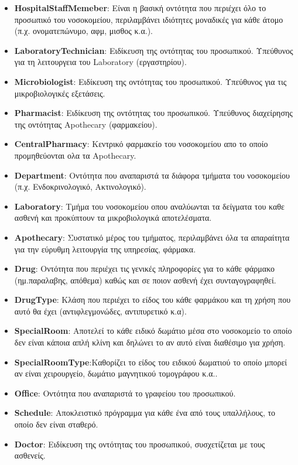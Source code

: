 \documentclass{article}
\begin{document}
\begin{itemize}
    \item \textbf{HospitalStaffMemeber}: Είναι η βασική οντότητα που περιέχει όλο το προσωπικό του νοσοκομείου, περιλαμβάνει ιδιότητες μοναδικές για κάθε άτομο (π.χ. ονοματεπώνυμο, αφμ, μισθος κ.α.).
    \item \textbf{LaboratoryTechnician}: Ειδίκευση της οντότητας του προσωπικού. Υπεύθυνος για τη λειτουργεια του Laboratory (εργαστηρίου).
    \item \textbf{Microbiologist}: Ειδίκευση της οντότητας του προσωπικού. Υπεύθυνος για τις μικροβιολογικές εξετάσεις.
    \item \textbf{Pharmacist}: Ειδίκευση της οντότητας του προσωπικού. Υπεύθυνος διαχείρησης της οντότητας Apothecary (φαρμακείου).
    \item \textbf{CentralPharmacy}: Κεντρικό φαρμακείο του νοσοκομείου απο το οποίο προμηθεύονται ολα τα Apothecary.
    \item \textbf{Department}: Οντότητα που αναπαριστά τα διάφορα τμήματα του νοσοκομείου (π.χ. Ενδοκρινολογικό, Ακτινολογικό).
    \item \textbf{Laboratory}: Τμήμα του νοσοκομείου οπου αναλύωνται τα δείγματα του καθε ασθενή και προκύπτουν τα μικροβιολογικά αποτελέσματα. 
    \item \textbf{Apothecary}: Συστατικό μέρος του τμήματος, περιλαμβάνει όλα τα απαραίτητα για την εύρυθμη λειτουργία της υπηρεσίας, φάρμακα.
    \item \textbf{Drug}: Οντότητα που περιέχει τις γενικές πληροφορίες για το κάθε φάρμακο (ημ.παραλαβης, απόθεμα) καθώς και σε ποιον ασθενή έχει συνταγογραφηθεί.
    \item \textbf{DrugType}: Κλάση που περιέχει το είδος του κάθε φαρμάκου και τη χρήση που αυτό θα έχει (αντιφλεγμονώδες, αντιπυρετικό κ.α).
    \item \textbf{SpecialRoom}: Αποτελεί το κάθε ειδικό δωμάτιο μέσα στο νοσοκομείο το οποίο δεν είναι κάποια απλή κλίνη και δηλώνει το αν αυτό είναι διαθέσιμο για χρήση.
    \item \textbf{SpecialRoomType}:Καθορίζει το είδος του ειδικού δωματιού το οποίο μπορεί αν είναι χειρουργείο, δωμάτιο μαγνητικού τομογράφου κ.α..
    \item \textbf{Office}: Οντότητα που αναπαριστά το γραφείου του προσωπικού.
    \item \textbf{Schedule}: Αποκλειστικό πρόγραμμα για κάθε ένα από τους υπαλλήλους, το οποίο δεν είναι σταθερό.
    \item \textbf{Doctor}: Ειδίκευση της οντότητας του προσωπικού, συσχετίζεται με τους ασθενείς.

\end{itemize}
\end{document}
